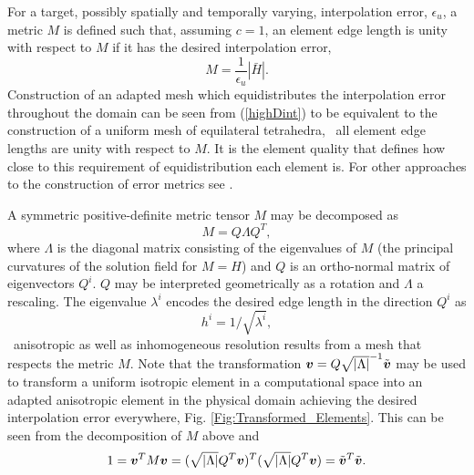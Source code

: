 For a target, possibly spatially and temporally varying, interpolation
error, $\epsilon_u$, a metric $M$ is defined such that, assuming
$c=1$, an element edge length is unity with respect to $M$ if it has
the desired interpolation error, \ie\
\begin{equation}
  M = \frac{1}{\epsilon_u} {|\bar{H}|}.
  \label{eqn:ME}
\end{equation}
Construction of an adapted mesh which equidistributes the
interpolation error throughout the domain can be seen from
(\ref{highDint}) to be equivalent to the construction of a uniform
mesh of equilateral tetrahedra, \ie\ all element edge lengths are
unity with respect to $M$. It is the element quality that defines how
close to this requirement of equidistribution each element is.  For
other approaches to the construction of error metrics see
\cite{micheletti2005,power2006,bernard2007}.

A symmetric positive-definite metric tensor $M$ may be decomposed as
\begin{equation*}
M = Q \Lambda Q^T,
\end{equation*}
where $\Lambda$ is the diagonal matrix consisting of the eigenvalues
of $M$ (the principal curvatures of the solution field for $M=H$) and
$Q$ is an ortho-normal matrix of eigenvectors ${Q}^i$. $Q$ may be
interpreted geometrically as a rotation and $\Lambda$ a rescaling.
The eigenvalue $\lambda^i$ encodes the desired edge length in the
direction ${Q}^i$ as
\begin{equation*}
h^i = 1 / \sqrt{{\lambda}^i},
\end{equation*}
\ie\ anisotropic as well as inhomogeneous resolution results from a
mesh that respects the metric $M$. Note that the transformation
${{\mbox{\boldmath$v$}}}=Q\sqrt{|\Lambda|}^{-1}\tilde{{\mbox{\boldmath$v$}}}$ may be used to transform a
uniform isotropic element in a computational space into an adapted
anisotropic element in the physical domain achieving the desired
interpolation error everywhere,
Fig. \ref{Fig:Transformed_Elements}. This can be seen from the
decomposition of $M$ above and
\begin{equation*}
1={{\mbox{\boldmath$v$}}}^T  M {{\mbox{\boldmath$v$}}} = (\sqrt{|\Lambda|}Q^T{\mbox{\boldmath$v$}})^T(\sqrt{|\Lambda|}Q^T{\mbox{\boldmath$v$}})=\tilde{{\mbox{\boldmath$v$}}}^T\tilde{{\mbox{\boldmath$v$}}}.
\end{equation*}

